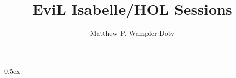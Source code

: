 \documentclass[11pt]{article}
\begin{document}
\title{EviL Isabelle/HOL Sessions}
\author{Matthew P. Wampler-Doty}
\maketitle

\tableofcontents


\newpage

\parindent 0pt\parskip 0.5ex


\end{document}
